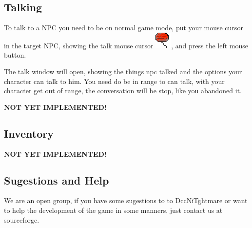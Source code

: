 \documentclass[ letterpaper,12pt]{article}
\begin{document}
\subsection{Talking}

To talk to a NPC you need to be on normal game mode, put your mouse cursor in the target NPC, showing the talk mouse cursor \includegraphics{talk.png}, and press the left mouse button.

The talk window will open, showing the things npc talked and the options your character can talk to him. You need do be in range to can talk, with your character get out of range, the conversation will be stop, like you abandoned it.

{\bf NOT YET IMPLEMENTED!}

\subsection{Inventory}

{\bf NOT YET IMPLEMENTED!}

\subsection{Sugestions and Help}

We are an open group, if you have some sugestions to to DccNiTghtmare or want to help the development of the game in some manners, just contact us at sourceforge.
\end{document}
